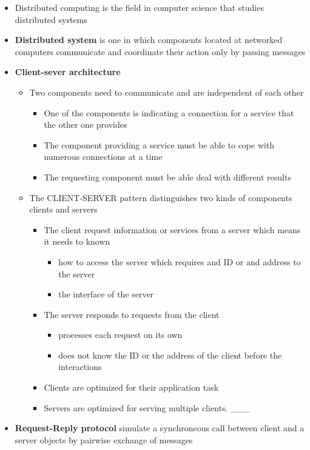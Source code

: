 \documentclass[11pt]{article}
\providecommand{\tightlist}{%
      \setlength{\itemsep}{0pt}\setlength{\parskip}{0pt}}
\begin{document}
\begin{itemize}
\tightlist
\item
  Distributed computing is the field in computer science that studies
  distributed systems
\item
  \textbf{Distributed system} is one in which components located at
  networked computers communicate and coordinate their action only by
  passing messages
\item
  \textbf{Client-sever architecture}

  \begin{itemize}
  \tightlist
  \item
    Two components need to communicate and are independent of each other

    \begin{itemize}
    \tightlist
    \item
      One of the components is indicating a connection for a service
      that the other one provides
    \item
      The component providing a service must be able to cope with
      numerous connections at a time
    \item
      The requesting component must be able deal with different results
    \end{itemize}
  \item
    The CLIENT-SERVER pattern distinguishes two kinds of components
    clients and servers

    \begin{itemize}
    \tightlist
    \item
      The client request information or services from a server which
      means it needs to known

      \begin{itemize}
      \tightlist
      \item
        how to access the server which requires and ID or and address to
        the server
      \item
        the interface of the server
      \end{itemize}
    \item
      The server responds to requests from the client

      \begin{itemize}
      \tightlist
      \item
        processes each request on its own
      \item
        does not know the ID or the address of the client before the
        interactions
      \end{itemize}
    \item
      Clients are optimized for their application task
    \item
      Servers are optimized for serving multiple clients. \_\_\_
    \end{itemize}
  \end{itemize}
\item
  \textbf{Request-Reply protocol} simulate a synchroneous call between
  client and a server objects by pairwise exchange of messages


\end{itemize}
\end{document}
